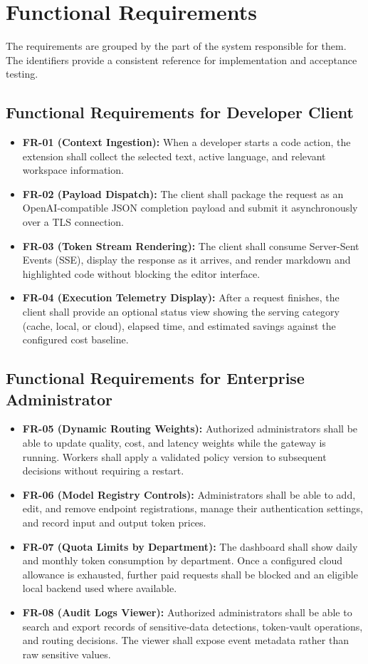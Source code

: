 \section{Functional Requirements}
\label{sec:functional-reqs}

The requirements are grouped by the part of the system responsible for them. The identifiers provide a consistent reference for implementation and acceptance testing.

\subsection{Functional Requirements for Developer Client}
\begin{itemize}
    \item \textbf{FR-01 (Context Ingestion):} When a developer starts a code action, the extension shall collect the selected text, active language, and relevant workspace information.
    \item \textbf{FR-02 (Payload Dispatch):} The client shall package the request as an OpenAI-compatible JSON completion payload and submit it asynchronously over a TLS connection.
    \item \textbf{FR-03 (Token Stream Rendering):} The client shall consume Server-Sent Events (SSE), display the response as it arrives, and render markdown and highlighted code without blocking the editor interface.
    \item \textbf{FR-04 (Execution Telemetry Display):} After a request finishes, the client shall provide an optional status view showing the serving category (cache, local, or cloud), elapsed time, and estimated savings against the configured cost baseline.
\end{itemize}

\subsection{Functional Requirements for Enterprise Administrator}
\begin{itemize}
    \item \textbf{FR-05 (Dynamic Routing Weights):} Authorized administrators shall be able to update quality, cost, and latency weights while the gateway is running. Workers shall apply a validated policy version to subsequent decisions without requiring a restart.
    \item \textbf{FR-06 (Model Registry Controls):} Administrators shall be able to add, edit, and remove endpoint registrations, manage their authentication settings, and record input and output token prices.
    \item \textbf{FR-07 (Quota Limits by Department):} The dashboard shall show daily and monthly token consumption by department. Once a configured cloud allowance is exhausted, further paid requests shall be blocked and an eligible local backend used where available.
    \item \textbf{FR-08 (Audit Logs Viewer):} Authorized administrators shall be able to search and export records of sensitive-data detections, token-vault operations, and routing decisions. The viewer shall expose event metadata rather than raw sensitive values.
\end{itemize}

